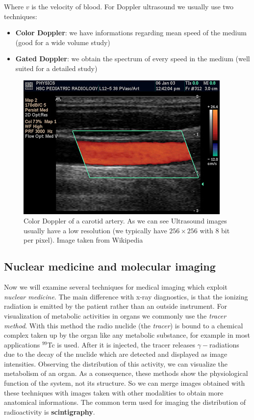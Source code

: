 Where $v$ is the velocity of blood. For Doppler ultrasound we usually use two techniques:
\begin{itemize}
 \item \textbf{Color Doppler}: we have informations regarding mean speed of the medium (good for a wide volume study)
 \item \textbf{Gated Doppler}: we obtain the spectrum of every speed in the medium (well suited for a detailed study)
\end{itemize}

\begin{figure}[htb] %
   \centering
   \includegraphics[width=0.40\linewidth]{images/ColourDopplerA.jpg}
   \caption[Color Doppler]{Color Doppler of a carotid artery. As we can see Ultrasound images usually have a low resolution (we typically have $256\times256$ with 8 bit per pixel). Image taken from Wikipedia}
   \label{fig:ultrasound}
\end{figure}

\subsection{Nuclear medicine and molecular imaging}

Now we will examine several techniques for medical imaging which exploit \textit{nuclear medicine}. The main difference with x-ray diagnostics, is that the ionizing radiation is emitted by the patient rather than an outside instrument. For visualization of metabolic activities in organs we commonly use the \textit{tracer method}. With this method the radio nuclide (the \textit{tracer}) is bound to a chemical complex taken up by the organ like any metabolic substance, for example in most applications $^{99}$Tc is used. After it is injected, the tracer releases $\gamma-$radiations due to the decay of the nuclide which are detected and displayed as image intensities. Observing the distribution of this activity, we can visualize the metabolism of an organ. As a consequence, these methods show the physiological function of the system, not its structure. So we can merge images obtained with these techniques with images taken with other modalities to obtain more anatomical informations. The common term used for imaging the distribution of radioactivity is \textbf{scintigraphy}.\\

